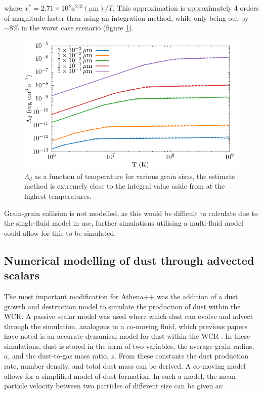 where $x^* = 2.71\times 10^8 a^{2/3} (\si{\micro\metre})/T$.
This approximation is approximately 4 orders of magnitude faster than using an integration method, while only being out by $\sim 8\%$ in the worst case scenario (figure \ref{fig:lambdacomparison}).

\begin{figure}
  \centering
  \includegraphics{assets/grain-transparency/lambda-comp.pdf}
  \caption[Comparison of electron transparency methods.]{$\Lambda_d$ as a function of temperature for various grain sizes, the estimate method is extremely close to the integral value aside from at the highest temperatures.}
  \label{fig:lambdacomparison}
\end{figure}


Grain-grain collision is not modelled, as this would be difficult to calculate due to the single-fluid model in use, further simulations utilising a multi-fluid model could allow for this to be simulated.


\subsection{Numerical modelling of dust through advected scalars}

The most important modification for Athena++ was the addition of a dust growth and destruction model to simulate the production of dust within the WCR.
A passive scalar model was used where which dust can evolve and advect through the simulation, analogous to a co-moving fluid, which previous papers have noted is an accurate dynamical model for dust within the WCR \parencite{hendrix_pinwheels_2016}.
In these simulations, dust is stored in the form of two variables, the average grain radius, $a$, and the dust-to-gas mass ratio, $z$.
From these constants the dust production rate, number density, and total dust mass can be derived.
A co-moving model allows for a simplified model of dust formation. In such a model, the mean particle velocity between two particles of different size can be given as:

